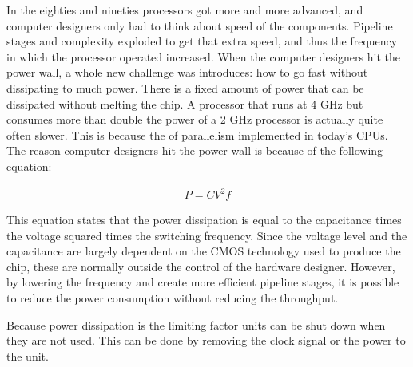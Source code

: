 In the eighties and nineties processors got more and more advanced, and computer designers only had to think about speed of the components. Pipeline stages and complexity exploded to get that extra speed, and thus the frequency in which the processor operated increased. When the computer designers hit the power wall, a whole new challenge was introduces: how to go fast without dissipating to much power. There is a fixed amount of power that can be dissipated without melting the chip. A processor that runs at 4 GHz but consumes more than double the power of a 2 GHz processor is actually quite often slower. This is because the of parallelism implemented in today's CPUs. The reason computer designers hit the power wall is because of the following equation:

\begin{eqnarray}
\label{Power Dissipation}
P = CV^2f 
\end{eqnarray}

This equation states that the power dissipation is equal to the capacitance times the voltage squared times the switching frequency. Since the voltage level and the capacitance are largely dependent on the CMOS technology used to produce the chip, these are normally outside the control of the hardware designer. However, by lowering the frequency and create more efficient pipeline stages, it is possible to reduce the power consumption without reducing the throughput. 

Because power dissipation is the limiting factor units can be shut down when they are not used. This can be done by removing the clock signal or the power to the unit. 